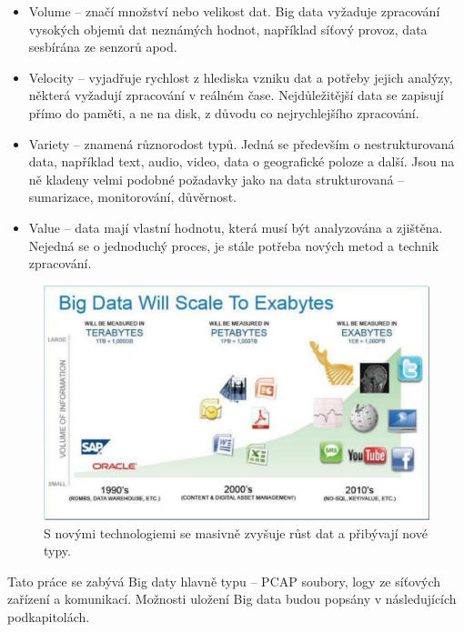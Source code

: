 \begin{itemize}
\item Volume – značí množství nebo velikost dat. Big data vyžaduje zpracování vysokých objemů dat neznámých hodnot, například síťový provoz, data sesbírána ze senzorů apod.

\item Velocity – vyjadřuje rychlost z hlediska vzniku dat a potřeby jejich analýzy, některá vyžadují zpracování v reálném čase. Nejdůležitější data se zapisují přímo do paměti, a ne na disk, z důvodu co nejrychlejšího zpracování.

\item Variety – znamená různorodost typů. Jedná se především o nestrukturovaná data, například text, audio, video, data o geografické poloze a další. Jsou na ně kladeny velmi podobné požadavky jako na data strukturovaná – sumarizace, monitorování, důvěrnost. \cite{oracleBigData}

\item Value – data mají vlastní hodnotu, která musí být analyzována a zjištěna. Nejedná se o jednoduchý proces, je stále potřeba nových metod a technik zpracování.
\end{itemize}

\begin{figure}[!h]
  \centering
  \includegraphics[width=15cm]{template-fig/big_data_exabytes.pdf}
  \caption{S novými technologiemi se masivně zvyšuje růst dat a přibývají nové typy. \cite{rajeshBigData}}
  \label{FIG_BigDataExabytes}
\end{figure}

\noindent Tato práce se zabývá Big daty hlavně typu – PCAP soubory, logy ze síťových zařízení a komunikací. Možnosti uložení Big data budou popsány v následujících podkapitolách.


